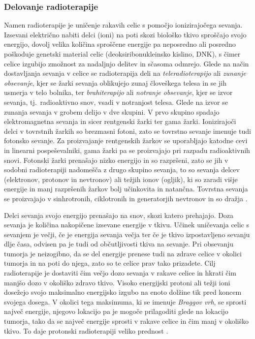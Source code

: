 \documentclass[a4paper,twoside,11pt]{article}
\begin{document}
	\subsubsection*{Delovanje radioterapije}
	\par{
	  Namen radioterapije je uničenje rakavih celic s pomočjo ionizirajočega sevanja. Izsevani električno nabiti delci (ioni) na poti skozi biološko tkivo sproščajo svojo energijo, dovolj velika količina sproščene energije pa neposredno ali posredno poškoduje genetski material celic (deoksiribonukleinsko kislino, DNK), s čimer celice izgubijo zmožnost za nadaljnjo delitev in sčasoma odmrejo. Glede na način dostavljanja sevanja v celice se radioterapija deli na \emph{teleradioterapijo} ali \emph{zunanje obsevanje}, kjer se žarki sevanja oblikujejo zunaj človeškega telesa in se jih usmerja v telo bolnika, ter \emph{brahiterapijo} ali \emph{notranje obsevanje}, kjer se izvor sevanja, tj.~radioaktivno snov, vsadi v notranjost telesa. Glede na izvor se zunanja sevanja v grobem delijo v dve skupini. V prvo skupino spadajo elektromagnetna sevanja in sicer rentgenski žarki ter gama žarki. Ionizirajoči delci v tovrstnih žarkih so brezmasni fotoni, zato se tovrstno sevanje imenuje tudi fotonsko sevanje. Za proizvajanje rentgenskih žarkov se uporabljajo katodne cevi in linearni pospeševalniki, gama žarki pa se proizvajajo pri razpadu radioaktivnih snovi. Fotonski žarki prenašajo nizko energijo in so razpršeni, zato se jih v sodobni radioterapiji nadomešča z drugo skupino sevanja, to so sevanja delcev (elektronov, protonov in nevtronov) ali težjih ionov (ogljik), ki so zaradi višje energije in manj razpršenih žarkov bolj učinkovita in natančna. Tovrstna sevanja se proizvajajo v sinhrotronih, ciklotronih in generatorjih nevtronov in so dražja \citep{baskar2012}.
	}
	\par{
	  Delci sevanja svojo energijo prenašajo na snov, skozi katero prehajajo. Doza sevanja je količina nakopičene izsevane energije v tkivu. Učinek uničevanja celic s sevanjem je večji, če je energija sevanja večja ter če je tkivo izpostavljeno sevanju dlje časa, odvisen pa je tudi od občutljivosti tkiva na sevanje. Pri obsevanju tumorja je neizogibno, da se del energije prenese tudi na zdrave celice v okolici tumorja in na poti do njega, zato so te celice prav tako prizadete. Cilj radioterapije je dostaviti čim večjo dozo sevanja v rakave celice in hkrati čim manjšo dozo v okoliško zdravo tkivo. Visoko energijski protoni ali težji ioni dosežejo svojo maksimalno energijsko izgubo na enoto dolžine tik pred koncem svojega dosega. V okolici tega maksimuma, ki se imenuje \emph{Braggov vrh}, se sprosti največ energije, njegovo lokacijo pa je mogoče prilagoditi glede na lokacijo tumorja, tako da se največ energije sprosti v rakave celice in čim manj v okoliško tkivo. To daje protonski radioterapiji veliko prednost \citep{gregoire2015}.
	}
\end{document}
